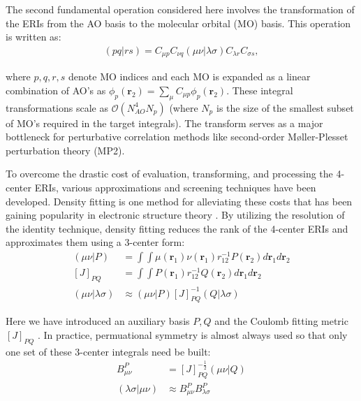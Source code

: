 The second fundamental operation considered here involves the transformation of the ERIs from the AO basis 
to the molecular orbital (MO) basis. This operation is written as:
\begin{align}
(pq | rs) = C_{\mu p}C_{ \nu q}
(\mu \nu | \lambda \sigma)C_{\lambda r}C_{\sigma s},
\end{align} 

\noindent where $p,q,r,s$ denote MO indices and each MO is expanded as a linear combination of AO's as 
$\phi_p(\textbf{r}_{2})=\sum_\mu C_{\mu p} \phi_p(\textbf{r}_{2})$.
These integral transformations scale 
as $\mathcal{O}(N_{AO}^4N_p)$ (where $N_p$ is the size of the smallest subset of MO's required in the target integrals). 
The transform serves as a major 
bottleneck for perturbative correlation methods like second-order M{\o}ller-Plesset perturbation theory (MP2).

To overcome the drastic cost of evaluation, transforming, and processing the 4-center ERIs, various approximations 
and screening techniques have been developed. 
Density fitting \cite{Whitten:1973:4496, Dunlap:1977:81, Dunlap:1979:3396, Dunlap:1979:4993, Kendall:1997:158}
is one method for alleviating these costs that has been gaining popularity in electronic structure theory 
\cite{Sherrill:2010:110902, Feyereisen:1993:359, Weigend:2002:4285, ref4, ref5}.
By utilizing the resolution of the identity technique, 
density fitting reduces the rank of the 4-center ERIs and approximates them using a 3-center form: 
\begin{align} 
(\mu \nu|P) &= \int \int \mu(\textbf{r}_{1}) 
\nu(\textbf{r}_{1}) r^{-1}_{12} P(\textbf{r}_{2}) d\textbf{r}_{1} d\textbf{r}_{2} \\
[J]_{PQ} &= \int \int P(\textbf{r}_1)r_{12}^{-1}Q(\textbf{r}_2) d{\textbf{r}_{1}}d{\textbf{r}_{2}} \\
(\mu \nu|\lambda \sigma) &\approx (\mu \nu| P)[J]_{PQ}^{-1}(Q|\lambda \sigma)  
\end{align} 

\noindent Here we have introduced an auxiliary basis $P, Q$ and the Coulomb fitting metric $[J]_{PQ}$ \cite{ref2}. 
In practice, permuational symmetry is almost always used so that only one set of these 3-center integrals need be built:
\begin{align} 
B_{\mu \nu}^P &= [J]_{PQ}^{-\frac{1}{2}}(\mu \nu | Q)  \\ 
(\lambda \sigma | \mu \nu) &\approx  B_{\mu \nu}^P B_{\lambda \sigma}^P  \end{align} 

